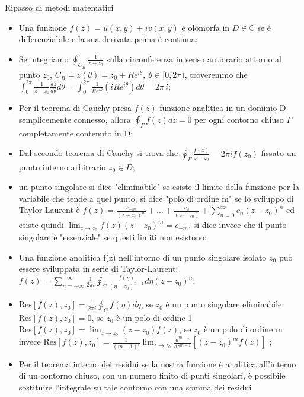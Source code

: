 \vspace{0.5cm}
\begin{approfondimento}{Ripasso di metodi matematici}
	
	\begin{itemize}
		\item Una funzione $f(z)=u(x,y)+iv(x,y)$ è olomorfa in $D\in \mathbb C$ se è differenziabile e la sua derivata prima è continua;
		\item Se integriamo $\oint_{C^+_R} \frac{1}{z-z_0}$ sulla circonferenza in senso antiorario attorno al punto $z_0$, $C^+_R={z(\theta)=z_0 + Re^{i\theta},\ \theta\in [0,2\pi)}$, troveremmo che $\int_0^{2\pi} \frac{1}{z-z_0} \frac{dz}{d\theta}d\theta = \int_0^{2\pi} \frac{1}{Re^{i\theta}}(iRe^{i\theta})d\theta= 2\pi\, i$;
		\item Per il \underline{teorema di Cauchy} presa $f(z)$ funzione analitica in un dominio D semplicemente connesso, allora $\oint_\Gamma f(z) dz = 0$ per ogni contorno chiuso $\Gamma$ completamente contenuto in D;
		\item Dal secondo teorema di Cauchy si trova che $\oint_\Gamma \frac{f(z)}{z-z_0}=2\pi i f(z_0)$ fissato un punto interno arbitrario $z_0\in D$;
		\item un punto singolare si dice "eliminabile" se esiste il limite della funzione per la variabile che tende a quel punto, si dice "polo di ordine m" se lo sviluppo di Taylor-Laurent è $f(z)=\frac{c_{-m}}{(z-z_0)^m} +\dots + \frac{c_0}{(z-z_0)} + \sum_{n=0}^\infty c_n (z-z_0)^n$ ed esiste quindi $\lim_{z\to z_0}f(z)(z-z_0)^m = c_{-m}$, si dice invece che il punto singolare è "essenziale" se questi limiti non esistono;
		\item Una funzione analitica f(z) nell'intorno di un punto singolare isolato $z_0$ può essere sviluppata in serie di Taylor-Laurent: $f(z)=\sum_{n=-\infty}^{+\infty} \frac{1}{2\pi i} \oint_C \frac{f(\eta)}{(\eta - z_0)^{n+1}}d\eta (z-z_0)^n$;
		\item $\text{Res}[f(z), z_0] = \frac{1}{2\pi i} \oint_C f(\eta)d\eta$, se $z_0$ è un punto singolare eliminabile $\text{Res}[f(z), z_0] = 0$, se $z_0$ è un polo di ordine 1 $\text{Res}[f(z), z_0] = \lim_{z \to z_0}(z-z_0)f(z)$, se $z_0$ è un polo di ordine m invece $\text{Res}[f(z), z_0] = \frac{1}{(m-1)!} \lim_{z \to z_0}\frac{d^{m-1}}{dz^{m-1}}[(z-z_0)^m f(z)]$  ;
		\item Per il teorema interno dei residui se la nostra funzione è analitica all'interno di un contorno chiuso, con un numero finito di punti singolari, è possibile sostituire l'integrale su tale contorno con una somma dei residui 

\end{itemize}
\end{approfondimento}
